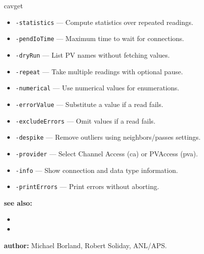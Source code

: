 \begin{sddsprog}{cavget}
\begin{itemize}
  \item {\tt -statistics} --- Compute statistics over repeated readings.
  \item {\tt -pendIoTime} --- Maximum time to wait for connections.
  \item {\tt -dryRun} --- List PV names without fetching values.
  \item {\tt -repeat} --- Take multiple readings with optional pause.
  \item {\tt -numerical} --- Use numerical values for enumerations.
  \item {\tt -errorValue} --- Substitute a value if a read fails.
  \item {\tt -excludeErrors} --- Omit values if a read fails.
  \item {\tt -despike} --- Remove outliers using neighbors/passes settings.
  \item {\tt -provider} --- Select Channel Access (ca) or PVAccess (pva).
  \item {\tt -info} --- Show connection and data type information.
  \item {\tt -printErrors} --- Print errors without aborting.
\end{itemize}
\item \textbf{see also:}
\begin{itemize}
  \item {}
  \item {}
\end{itemize}
\item \textbf{author:} Michael Borland, Robert Soliday, ANL/APS.
\end{sddsprog}
